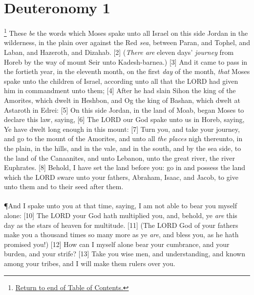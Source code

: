 \chapter{Deuteronomy 1}
\footnote{\textcolor[rgb]{0.00,0.25,0.00}{\hyperlink{DeuteronomyTOC}{Return to end of Table of Contents.}}}
\textcolor[rgb]{0.00,0.00,1.00}{These \emph{be} the words which Moses spake unto all Israel on this side Jordan in the wilderness, in the plain over against the Red \emph{sea}, between Paran, and Tophel, and Laban, and Hazeroth, and Dizahab.}
[2] \textcolor[rgb]{0.00,0.00,1.00}{(\emph{There are} eleven days' \emph{journey} from Horeb by the way of mount Seir unto Kadesh-barnea.)}
[3] \textcolor[rgb]{0.00,0.00,1.00}{And it came to pass in the fortieth year, in the eleventh month, on the first \emph{day} of the month, \emph{that} Moses spake unto the children of Israel, according unto all that the LORD had given him in commandment unto them;}
[4] \textcolor[rgb]{0.00,0.00,1.00}{After he had slain Sihon the king of the Amorites, which dwelt in Heshbon, and Og the king of Bashan, which dwelt at Astaroth in Edrei:}
[5] \textcolor[rgb]{0.00,0.00,1.00}{On this side Jordan, in the land of Moab, began Moses to declare this law, saying,}
[6] \textcolor[rgb]{0.00,0.00,1.00}{The LORD our God spake unto us in Horeb, saying, Ye have dwelt long enough in this mount:}
[7] \textcolor[rgb]{0.00,0.00,1.00}{Turn you, and take your journey, and go to the mount of the Amorites, and unto all \emph{the places} nigh thereunto, in the plain, in the hills, and in the vale, and in the south, and by the sea side, to the land of the Canaanites, and unto Lebanon, unto the great river, the river Euphrates.}
[8] \textcolor[rgb]{0.00,0.00,1.00}{Behold, I have set the land before you: go in and possess the land which the LORD sware unto your fathers, Abraham, Isaac, and Jacob, to give unto them and to their seed after them.}\\
\\
\P \textcolor[rgb]{0.00,0.00,1.00}{And I spake unto you at that time, saying, I am not able to bear you myself alone:}
[10] \textcolor[rgb]{0.00,0.00,1.00}{The LORD your God hath multiplied you, and, behold, ye \emph{are} this day as the stars of heaven for multitude.}
[11] \textcolor[rgb]{0.00,0.00,1.00}{(The LORD God of your fathers make you a thousand times so many more as ye \emph{are}, and bless you, as he hath promised you!)}
[12] \textcolor[rgb]{0.00,0.00,1.00}{How can I myself alone bear your cumbrance, and your burden, and your strife?}
[13] \textcolor[rgb]{0.00,0.00,1.00}{Take you wise men, and understanding, and known among your tribes, and I will make them rulers over you.}
